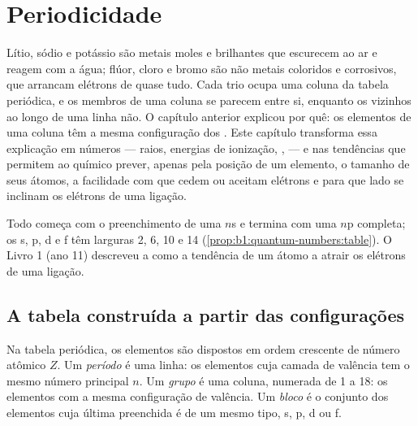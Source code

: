 \chapter{Periodicidade}\label{ch:b1:periodicity}

Lítio, sódio e potássio são metais moles e brilhantes que escurecem ao
ar e reagem com a água; flúor, cloro e bromo são não metais coloridos e
corrosivos, que arrancam elétrons de quase tudo. Cada trio ocupa uma
coluna da tabela periódica, e os membros de uma coluna se parecem entre
si, enquanto os vizinhos ao longo de uma linha não. O capítulo anterior
explicou por quê: os elementos de uma coluna têm a mesma configuração
dos . Este capítulo transforma essa explicação em
números --- raios, energias de ionização, ,
 --- e nas tendências que permitem ao químico prever,
apenas pela posição de um elemento, o tamanho de seus átomos, a
facilidade com que cedem ou aceitam elétrons e para que lado se inclinam
os elétrons de uma ligação.

\begin{recall}
Todo  começa com o preenchimento de uma  $n$s e termina
com uma  $n$p completa; os  s, p, d e f têm larguras 2, 6,
10 e 14 (\cref{prop:b1:quantum-numbers:table}). O Livro 1 (ano 11)
descreveu a  como a tendência de um átomo a atrair os
elétrons de uma ligação.
\end{recall}

\section{A tabela construída a partir das configurações}

\begin{definition}\label{def:b1:periodicity:table}
Na tabela periódica, os elementos são dispostos em ordem crescente de
número atômico $Z$. Um \emph{período} é uma linha:
os elementos cuja camada de valência tem o mesmo número principal $n$.
Um \emph{grupo} é uma coluna, numerada de 1 a 18: os
elementos com a mesma configuração de valência. Um \emph{bloco} é o
conjunto dos elementos cuja última  preenchida é de um mesmo
tipo, s, p, d ou f.
\end{definition}

